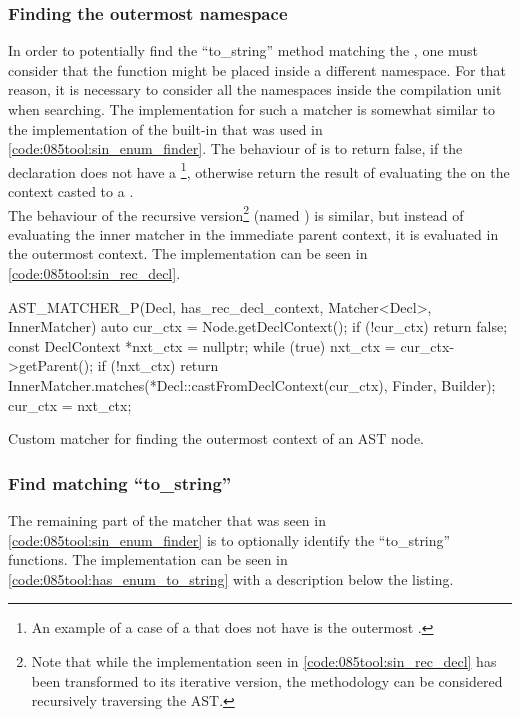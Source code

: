 \subsubsection*{Finding the outermost namespace}
In order to potentially find the ``to\_string'' method matching the , one must consider that the function might be placed inside a different namespace.
For that reason, it is necessary to consider all the namespaces inside the compilation unit when searching.
The implementation for such a matcher is somewhat similar to the implementation of the built-in  that was used in \cref{code:085tool:sin_enum_finder}. 
The behaviour of  is to return false, if the declaration does not have a \footnote{
    An example of a case of a  that does not have  is the outermost .
}, otherwise return the result of evaluating the  on the context casted to a .\\
The behaviour of the recursive version\footnote{Note that while the implementation seen in \cref{code:085tool:sin_rec_decl} has been transformed to its iterative version, the methodology can be considered recursively traversing the AST.} 
(named ) is similar, but instead of evaluating the inner matcher in the immediate parent context, it is evaluated in the outermost context. The implementation can be seen in \cref{code:085tool:sin_rec_decl}.

\begin{listing}[H]
    \begin{cppcode}
AST_MATCHER_P(Decl, has_rec_decl_context, Matcher<Decl>, InnerMatcher) {
	auto cur_ctx = Node.getDeclContext();
	if (!cur_ctx) {
		return false;
	}
	const DeclContext *nxt_ctx = nullptr;
	while (true) {
		nxt_ctx = cur_ctx->getParent();
		if (!nxt_ctx) {
			return InnerMatcher.matches(*Decl::castFromDeclContext(cur_ctx), Finder, Builder);
		}
		cur_ctx = nxt_ctx;
	}
}
    \end{cppcode}
    \caption{Custom matcher for finding the outermost context of an AST node.}
    \label{code:085tool:sin_rec_decl}
\end{listing}

\subsubsection*{Find matching ``to\_string''}
The remaining part of the  matcher that was seen in \cref{code:085tool:sin_enum_finder} is to optionally identify the ``to\_string'' functions. The implementation can be seen in \cref{code:085tool:has_enum_to_string} with a description below the listing.

